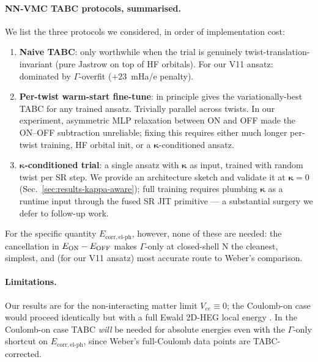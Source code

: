 \documentclass[reprint,amsmath,amssymb,aps,prb,floatfix,nofootinbib]{revtex4-2}
\newcommand{\Ehp}{E_{\mathrm{corr},\mathrm{el}\text{-}\mathrm{ph}}}
\begin{document}
\paragraph{NN-VMC TABC protocols, summarised.}
We list the three protocols we considered, in order of
implementation cost:
\begin{enumerate}
\item \textbf{Naive TABC}: only worthwhile when the trial is
      genuinely twist-translation-invariant (pure Jastrow on top of
      HF orbitals).  For our V11 ansatz: dominated by $\Gamma$-overfit
      ($+23$~mHa/e penalty).
\item \textbf{Per-twist warm-start fine-tune}: in principle gives
      the variationally-best TABC for any trained ansatz.  Trivially
      parallel across twists.  In our experiment, asymmetric MLP
      relaxation between ON and OFF made the ON--OFF subtraction
      unreliable; fixing this requires either much longer per-twist
      training, HF orbital init, or a $\bm\kappa$-conditioned
      ansatz.
\item \textbf{$\bm\kappa$-conditioned trial}: a single ansatz with
      $\bm\kappa$ as input, trained with random twist per SR step.
      We provide an architecture sketch and validate it at
      $\bm\kappa = 0$ (Sec.~\ref{sec:results-kappa-aware}); full
      training requires plumbing $\bm\kappa$ as a runtime input
      through the fused SR JIT primitive --- a substantial surgery
      we defer to follow-up work.
\end{enumerate}
For the specific quantity $\Ehp$, however, none of these are needed:
the cancellation in $E_{\rm ON} - E_{\rm OFF}$ makes $\Gamma$-only
at closed-shell N the cleanest, simplest, and (for our V11 ansatz)
most accurate route to Weber's comparison.

\paragraph{Limitations.}
Our results are for the non-interacting matter limit
$V_{ee} \equiv 0$; the Coulomb-on case would proceed identically
but with a full Ewald 2D-HEG local energy
\cite{Drummond2008,Fraser1996}.  In the Coulomb-on case TABC
\emph{will} be needed for absolute energies even with the
$\Gamma$-only shortcut on $\Ehp$, since Weber's full-Coulomb data
points are TABC-corrected.

\end{document}
